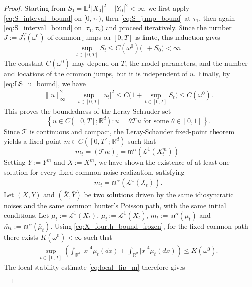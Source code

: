 \documentclass{article}
\def\m{\mathfrak{m}}
\numberwithin{equation}{section}
\begin{document}
\begin{proof}
Starting from $S_0=\mathbb E^1|X_0|^2+|Y_0|^2<\infty$, 
we first apply \eqref{eq:S_interval_bound} on $[0,\tau_1)$, then
\eqref{eq:S_jump_bound} at $\tau_1$, then again
\eqref{eq:S_interval_bound} on $[\tau_1,\tau_2)$ and proceed iteratively. Since the number
$J:=J_T^Y(\omega^0)$ of common jumps on $[0,T]$ is finite, this induction gives
\begin{equation*}
    \sup_{t\in[0,T]}S_t
    \le
    C(\omega^0)\bigl(1+S_0\bigr)
    <\infty .
\end{equation*}
The constant $C(\omega^0)$ may depend on $T$, the model parameters, and the number
and locations of the common jumps, but it is independent of $u$. Finally, by \eqref{eq:LS_u_bound}, we have
\begin{align*}
    \|u\|_\infty^2
    =
    \sup_{t\in[0,T]}|u_t|^2
    \leq
    C\big(1+\sup_{t\in[0,T]}S_t\big)
    \leq
    C(\omega^0).
\end{align*}
This proves the boundedness of the Leray-Schauder set
\begin{equation}
    \left\{
        u\in C([0,T];\mathbb R^d):
        u=\theta\mathcal T u
        \text{ for some }\theta\in[0,1]
    \right\}.
\end{equation}
Since $\mathcal T$ is continuous and compact, the Leray-Schauder fixed-point theorem yields a fixed point
$m\in C([0,T];\mathbb R^d)$ such that
\begin{equation}
    m_t=(\mathcal Tm)_t
    =
    \mathfrak m^\alpha(\mathcal L^1(X_t^m)).
\end{equation}
Setting $Y:=Y^m$ and $X:=X^m$, we have shown the existence of at least one solution for every fixed common-noise realization, satisfying
\begin{align}
    m_t =     \m^\alpha(\mathcal L^1(X_t)).
\end{align}
 Let $(X,Y)$ and $(\bar{X},\bar Y)$ be two solutions driven by the same idiosyncratic noises and the same common hunter's Poisson path, with the same initial conditions. Let $\mu_t:=\mathcal L^1(X_t)$, $\bar{\mu}_t:=\mathcal L^1(\bar X_t)$, $m_t:=\m^\alpha(\mu_t)$ and $\bar m_t:=\m^\alpha(\bar\mu_t)$.
Using \eqref{eq:X_fourth_bound_frozen}, for the fixed common path there exists $K(\omega^0)<\infty$ such that
\begin{align}
    \sup_{t\in[0,T]}
    \left(\int_{\mathbb R^d}|x|^4\mu_t(dx) + \int_{\mathbb R^d}|x|^4\bar\mu_t(dx)
    \right)
    \le K(\omega^0).
\end{align}
The local stability estimate \eqref{eq:local_lip_m} therefore gives
\begin{align*}

\end{align*}
\end{proof}
\end{document}
